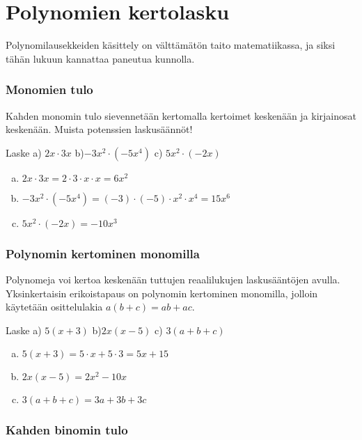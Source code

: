 \chapter{Polynomien kertolasku}

Polynomilausekkeiden käsittely on välttämätön taito matematiikassa, ja siksi tähän lukuun kannattaa paneutua kunnolla.

\subsection*{Monomien tulo}

Kahden monomin tulo sievennetään kertomalla kertoimet keskenään ja kirjainosat keskenään. Muista potenssien laskusäännöt!

\begin{esimerkki}
Laske \quad a) $2x\cdot 3x$ \quad b)$-3x^2\cdot (-5x^4)$ \quad 
c) $5x^2 \cdot (-2x)$
\begin{enumerate}[a)]
    \item $2x\cdot 3x = 2\cdot 3\cdot x\cdot x = 6x^2$
    \item $-3x^2\cdot (-5x^4) = (-3)\cdot (-5) \cdot x^2 \cdot x^4 = 15 x^6$
    \item $5x^2 \cdot (-2x) = -10 x^3$
\end{enumerate} 
\end{esimerkki}

\subsection*{Polynomin kertominen monomilla}

Polynomeja voi kertoa keskenään tuttujen reaalilukujen laskusääntöjen avulla. Yksinkertaisin erikoistapaus on polynomin kertominen monomilla, jolloin
käytetään osittelulakia $a(b+c)=ab+ac$.

\begin{esimerkki}
Laske \quad a) $5(x+3)$ \quad b)$2x(x-5)$ \quad 
c) $3(a+b+c)$
\begin{enumerate}[a)]
    \item $5(x+3) = 5\cdot x + 5\cdot 3 = 5x+15$
    \item $2x(x-5)=2x^2-10x$
    \item $3(a+b+c)=3a+3b+3c$
\end{enumerate}
\end{esimerkki} 

\subsection*{Kahden binomin tulo}

